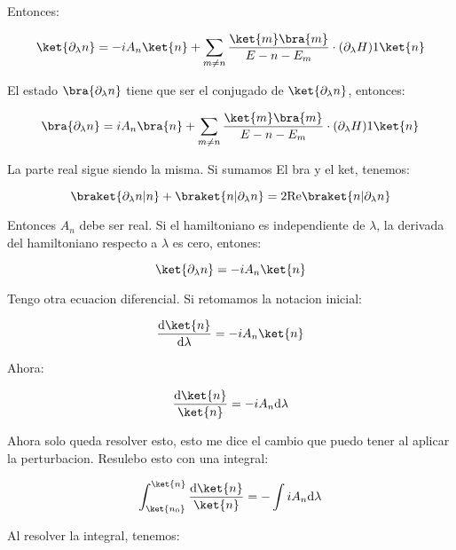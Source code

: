 \documentclass[11pt,fleqn]{book}
\begin{document}
Entonces:

\begin{equation}
    \ket{\partial_{\lambda}n}=-iA_{n}\ket{n}+\sum_{m\neq n}\frac{\ket{m}\bra{m}}{E-{n}-E_{m}}\cdot(\partial_{\lambda}H)1\ket{n}
\end{equation}

El estado $\bra{\partial_{\lambda}n}$ tiene que ser el conjugado de $\ket{\partial_{\lambda}n}$, entonces:

\begin{equation}
    \bra{\partial_{\lambda}n}=iA_{n}\bra{n}+\sum_{m\neq n}\frac{\ket{m}\bra{m}}{E-{n}-E_{m}}\cdot(\partial_{\lambda}H)1\ket{n}
\end{equation}

La parte real sigue siendo la misma. Si sumamos El bra y el ket, tenemos:

\begin{equation}
    \braket{\partial_{\lambda}n|n}+\braket{n|\partial_{\lambda}n}=2\text{Re}\braket{n|\partial_{\lambda}n}          
\end{equation}

Entonces $A_{n}$ debe ser real. Si el hamiltoniano es independiente de $\lambda$, la derivada del hamiltoniano respecto a $\lambda$ es cero, entones:

\begin{equation}
    \ket{\partial_{\lambda}n}=-iA_{n}\ket{n}
\end{equation}

Tengo otra ecuacion diferencial. Si retomamos la notacion inicial:

\begin{equation}
    \frac{\mathrm{d}\ket{n}}{\mathrm{d}\lambda}=-iA_{n}\ket{n}
\end{equation}

Ahora:

\begin{equation}
    \frac{\mathrm{d}\ket{n}}{\ket{n}}=-iA_{n}\mathrm{d}\lambda
\end{equation}

Ahora solo queda resolver esto, esto me dice el cambio que puedo tener al aplicar la perturbacion. Resulebo esto con una integral:

\begin{equation}
    \int_{\ket{n_{0}}}^{\ket{n}}\frac{\mathrm{d}\ket{n}}{\ket{n}}=-\int iA_{n}\mathrm{d}\lambda
\end{equation}

Al resolver la integral, tenemos:
\end{document}
